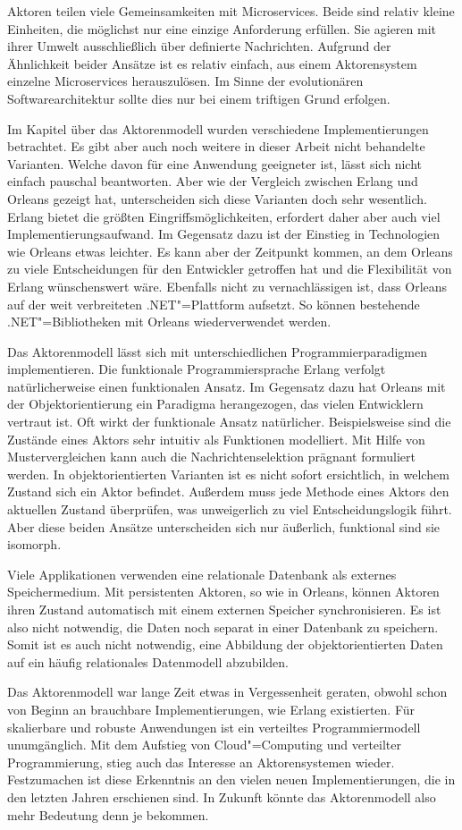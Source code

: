 Aktoren teilen viele Gemeinsamkeiten mit Microservices. Beide sind relativ kleine Einheiten, die möglichst nur eine einzige Anforderung erfüllen. Sie agieren mit ihrer Umwelt ausschließlich über definierte Nachrichten. Aufgrund der Ähnlichkeit beider Ansätze ist es relativ einfach, aus einem Aktorensystem einzelne Microservices herauszulösen. Im Sinne der evolutionären Softwarearchitektur sollte dies nur bei einem triftigen Grund erfolgen.

Im Kapitel über das Aktorenmodell wurden verschiedene Implementierungen betrachtet. Es gibt aber auch noch weitere in dieser Arbeit nicht behandelte Varianten. Welche davon für eine Anwendung geeigneter ist, lässt sich nicht einfach pauschal beantworten. Aber wie der Vergleich zwischen Erlang und Orleans gezeigt hat, unterscheiden sich diese Varianten doch sehr wesentlich. Erlang bietet die größten Eingriffsmöglichkeiten, erfordert daher aber auch viel Implementierungsaufwand. Im Gegensatz dazu ist der Einstieg in Technologien wie Orleans etwas leichter. Es kann aber der Zeitpunkt kommen, an dem Orleans zu viele Entscheidungen für den Entwickler getroffen hat und die Flexibilität von Erlang wünschenswert wäre. Ebenfalls nicht zu vernachlässigen ist, dass Orleans auf der weit verbreiteten .NET"=Plattform aufsetzt. So können bestehende .NET"=Bibliotheken mit Orleans wiederverwendet werden.

Das Aktorenmodell lässt sich mit unterschiedlichen Programmierparadigmen implementieren. Die funktionale Programmiersprache Erlang verfolgt natürlicherweise einen funktionalen Ansatz. Im Gegensatz dazu hat Orleans mit der Objektorientierung ein Paradigma herangezogen, das vielen Entwicklern vertraut ist. Oft wirkt der funktionale Ansatz natürlicher. Beispielsweise sind die Zustände eines Aktors sehr intuitiv als Funktionen modelliert. Mit Hilfe von Mustervergleichen kann auch die Nachrichtenselektion prägnant formuliert werden. In objektorientierten Varianten ist es nicht sofort ersichtlich, in welchem Zustand sich ein Aktor befindet. Außerdem muss jede Methode eines Aktors den aktuellen Zustand überprüfen, was unweigerlich zu viel Entscheidungslogik führt. Aber diese beiden Ansätze unterscheiden sich nur äußerlich, funktional sind sie isomorph.

Viele Applikationen verwenden eine relationale Datenbank als externes Speichermedium. Mit persistenten Aktoren, so wie in Orleans, können Aktoren ihren Zustand automatisch mit einem externen Speicher synchronisieren. Es ist also nicht notwendig, die Daten noch separat in einer Datenbank zu speichern. Somit ist es auch nicht notwendig, eine Abbildung der objektorientierten Daten auf ein häufig relationales Datenmodell abzubilden.

Das Aktorenmodell war lange Zeit etwas in Vergessenheit geraten, obwohl schon von Beginn an brauchbare Implementierungen, wie \zB Erlang existierten. Für skalierbare und robuste Anwendungen ist ein verteiltes Programmiermodell unumgänglich. Mit dem Aufstieg von Cloud"=Computing und verteilter Programmierung, stieg auch das Interesse an Aktorensystemen wieder. Festzumachen ist diese Erkenntnis an den vielen neuen Implementierungen, die in den letzten Jahren erschienen sind. In Zukunft könnte das Aktorenmodell also mehr Bedeutung denn je bekommen.